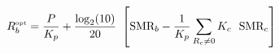 \documentclass{article}
\begin{document}
 
\[
R_b^{\mbox{\tiny opt}} = \frac{P}{K_p} + \frac{\log_2(10)}{20}   \
   \left[ \mbox{SMR}_b - \frac{1}{K_p}  \sum_{R_c \ne 0}  K_c \  \
   \mbox{SMR}_c \right]
\]
 \newpage 
\end{document}
